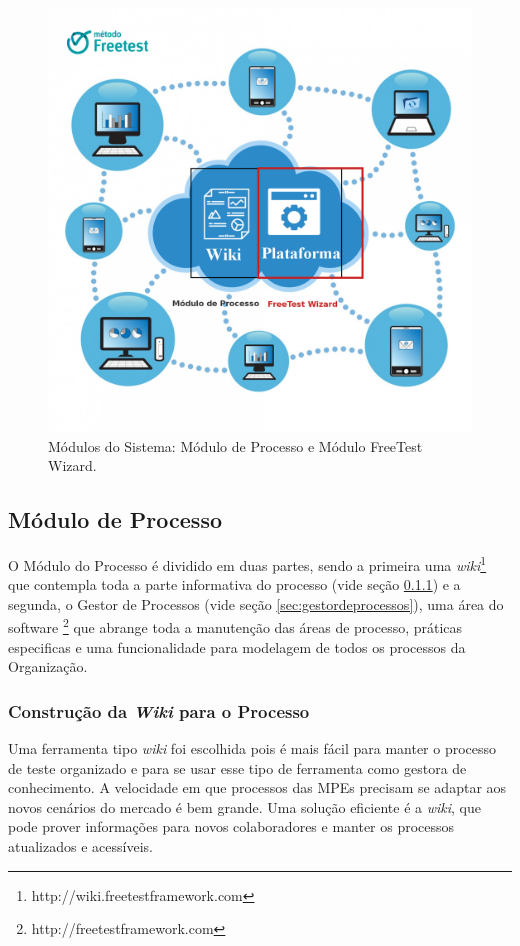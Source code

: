 \begin{figure}[H]
\centering
\includegraphics[width=.75\textwidth]{fig/figura63.png}
\caption{Módulos do Sistema: Módulo de Processo e Módulo FreeTest Wizard.}
\label{fig:fig63}
\end{figure}

\subsection{Módulo de Processo}
\label{sec:ferramentaprocesso}

O Módulo do Processo é dividido em duas partes, sendo a primeira uma \textit{wiki}\footnote{http://wiki.freetestframework.com} que contempla toda a parte informativa do processo (vide seção \ref{sec:wikiprocesso}) e a segunda, o Gestor de Processos (vide seção \ref{sec:gestordeprocessos}), uma área do software \footnote{http://freetestframework.com} que abrange toda a manutenção das áreas de processo, práticas especificas e uma funcionalidade para modelagem de todos os processos da Organização. 

\subsubsection{Construção da \textit{Wiki} para o Processo}
\label{sec:wikiprocesso}

Uma ferramenta tipo \textit{wiki} foi escolhida pois é mais fácil para manter o processo de teste organizado e para se usar esse tipo de ferramenta como gestora de conhecimento. A velocidade em que processos das MPEs precisam se adaptar aos novos cenários do mercado é bem grande. Uma solução eficiente é a \textit{wiki}, que pode prover informações para novos colaboradores e manter os processos atualizados e acessíveis. 

